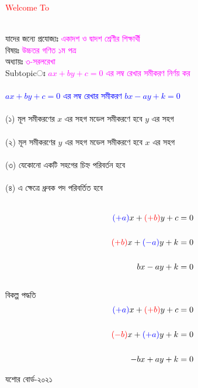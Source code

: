 \documentclass{article}
\begin{document}
 
	\Large
	\textcolor{red}{Welcome To} 
	\\
	\\
	যাদের জন্যে প্রযোজ্যঃ  	\textcolor{magenta}{একাদশ ও দ্বাদশ শ্রেণীর শিক্ষার্থী} \\
	বিষয়ঃ \textcolor{magenta}{উচ্চতর গণিত ১ম পত্র} \\
	অধ্যায়ঃ \textcolor{magenta}{৩-সরলরেখা}\\ 
	Subtopicঃ  \textcolor{magenta}{ $ax+by+c=0$ এর লম্ব রেখার সমীকরণ নির্ণয় কর }\\
	\\
	\textcolor{blue}{$ax+by+c=0$ এর লম্ব রেখার সমীকরণ   $bx-ay+k=0$}\\
	\\
(১) মূল সমীকরণের $x$ এর সহগ মডেল সমীকরণে হবে $y$ এর সহগ \\
	\\
(২) মূল সমীকরণের $y$ এর সহগ মডেল সমীকরণে হবে $x$ এর সহগ \\
		\\ 
(৩) যেকোনো একটি সহগের চিহ্ন পরিবর্তন হবে \\
\\
(৪) এ ক্ষেত্রে ধ্রুবক পদ পরিবর্তিত হবে \\ 
\\
\begin{multicols}{2}
	\begin{align*}
	\textcolor{blue}{(+a)}x+	\textcolor{red}{(+b)}y+c&=0\\
	\\
	\textcolor{red}{(+b)}x+	\textcolor{blue}{(-a)}y+k&=0\\
	\\
	bx-ay+k&=0
\end{align*}
\\
বিকল্প পদ্ধতি\\ 
\begin{align*}
	\textcolor{blue}{(+a)}x+	\textcolor{red}{(+b)}y+c&=0\\
	\\
	\textcolor{red}{(-b)}x+	\textcolor{blue}{(+a)}y+k&=0\\
	\\
	-bx+ay+k&=0
\end{align*}
\end{multicols}	
\vspace{2cm}
	 যশোর বোর্ড-২০২১\\ 
\end{document}
